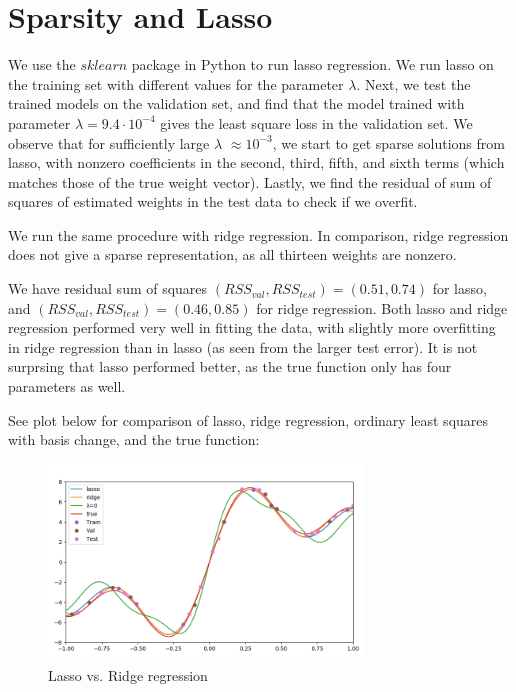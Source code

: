 \documentclass[8pt]{article}
\begin{document}


\section{Sparsity and Lasso}

We use the $sklearn$ package in Python to run lasso regression. We run lasso on the training set with different values for the parameter $\lambda$. Next, we test the trained models on the validation set, and find that the model trained with parameter $\lambda = 9.4 \cdot 10^{-4}$ gives the least square loss in the validation set. We observe that for sufficiently large $\lambda$ $\approx 10^{-3}$, we start to get sparse solutions from lasso, with nonzero coefficients in the second, third, fifth, and sixth terms (which matches those of the true weight vector). Lastly, we find the residual of sum of squares of estimated weights in the test data to check if we overfit.

We run the same procedure with ridge regression. In comparison, ridge regression does not give a sparse representation, as all thirteen weights are nonzero.

We have residual sum of squares $(RSS_{val}, RSS_{test}) = (0.51, 0.74)$ for lasso, and $(RSS_{val}, RSS_{test}) = (0.46, 0.85)$ for ridge regression. Both lasso and ridge regression performed very well in fitting the data, with slightly more overfitting in ridge regression than in lasso (as seen from the larger test error). It is not surprsing that lasso performed better, as the true function only has four parameters as well.

See plot below for comparison of lasso, ridge regression, ordinary least squares with basis change, and the true function:

\begin{figure}[H]
  \centering
  \includegraphics[width = 3.3in]{../P4/figs/lasso_ridge.png}
  \caption{Lasso vs. Ridge regression}
\end{figure}


\end{document}
